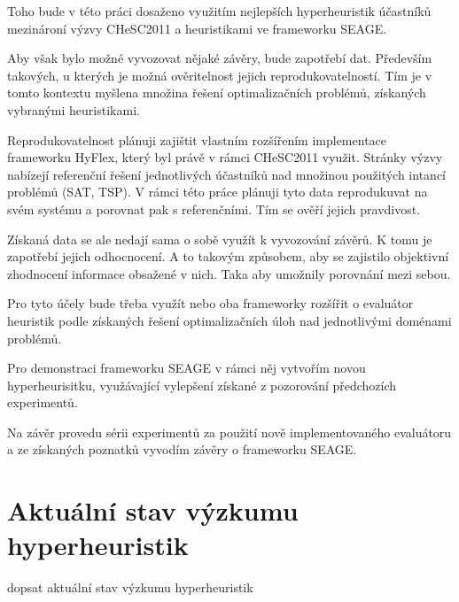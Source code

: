 
Toho bude v této práci dosaženo využitím nejlepších hyperheuristik účastníků mezinároní výzvy CHeSC2011 a heuristikami ve frameworku SEAGE.


Aby však bylo možné vyvozovat nějaké závěry, bude zapotřebí dat. Především takových, u kterých je možná ověritelnost jejich reprodukovatelností. Tím je v tomto kontextu myšlena množina řešení optimalizačních problémů, získaných vybranými heuristikami.

Reprodukovatelnost plánuji zajištit vlastním rozšířením implementace frameworku HyFlex, který byl právě v rámci CHeSC2011 využit. Stránky výzvy nabízejí referenční řešení jednotlivých účastníků nad množinou použitých intancí problémů (SAT, TSP). V rámci této práce plánuji tyto data reprodukuvat na svém systému a porovnat pak s referenčními. Tím se ověří jejich pravdivost. 

Získaná data se ale nedají sama o sobě využít k vyvozování závěrů. K tomu je zapotřebí jejich odhocnocení. A to takovým způsobem, aby se zajistilo objektivní zhodnocení informace obsažené v nich. Taka aby umožnily porovnání mezi sebou.

Pro tyto účely bude třeba využít nebo oba frameworky rozšířit o evaluátor heuristik podle získaných řešení optimalizačních úloh nad jednotlivými doménami problémů.

Pro demonstraci frameworku SEAGE v rámci něj vytvořím novou hyperheurisitku, využávající vylepšení získané z pozorování předchozích experimentů.

Na závěr provedu sérii experimentů za použití nově implementovaného evaluátoru a ze získaných poznatků vyvodím závěry o frameworku SEAGE.

\section{Aktuální stav výzkumu hyperheuristik}

dopsat aktuální stav výzkumu hyperheuristik
\cite{DRAKE2020405}
